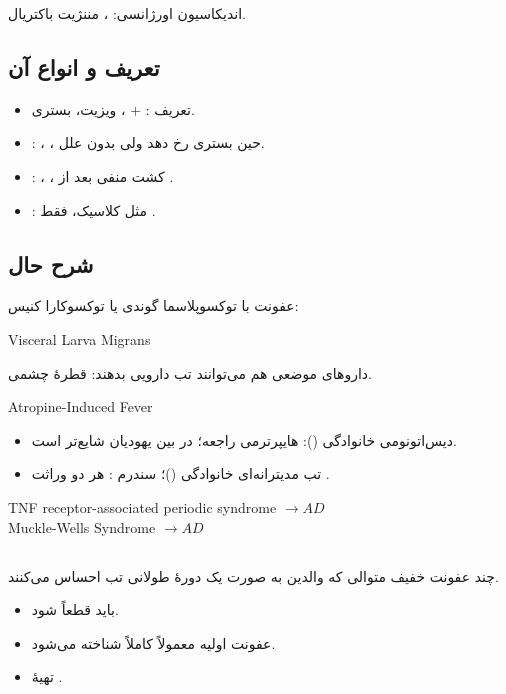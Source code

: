 \documentclass[12pt,a4paper]{article}
\begin{document}
اندیکاسیون  اورژانسی: ، مننژیت باکتریال.

\subsection*{تعریف  و انواع آن}
\begin{itemize}
\item تعریف :  + ،
   ویزیت،  بستری.
\item {}: ،
  ، حین بستری رخ دهد ولی بدون علل.
\item {}: ،
  ، کشت منفی بعد از .
\item {}: مثل  کلاسیک، فقط .
\end{itemize}

\subsection*{شرح حال }
عفونت با توکسوپلاسما گوندی یا توکسوکارا کنیس:
\begin{latin}
Visceral Larva Migrans
\end{latin}

داروهای موضعی هم می‌توانند تب دارویی بدهند: قطرهٔ چشمی.
\begin{latin}
Atropine-Induced Fever
\end{latin}

\begin{itemize}
\item دیس‌اتونومی خانوادگی (): هایپرترمی راجعه؛ در بین یهودیان شایع‌تر است.
\item تب مدیترانه‌ای خانوادگی ()؛ سندرم : هر دو وراثت .
\end{itemize}
\begin{latin}
TNF receptor-associated periodic syndrome \(\longrightarrow AD\)\\
Muckle-Wells Syndrome \(\longrightarrow AD\)
\end{latin}

\subsection*{}
چند عفونت خفیف متوالی که والدین به صورت یک دورهٔ طولانی تب احساس می‌کنند.
\begin{itemize}
\item باید قطعاً  شود.
\item عفونت اولیه معمولاً کاملاً شناخته می‌شود.
\item تهیهٔ .
\end{itemize}
\end{document}
